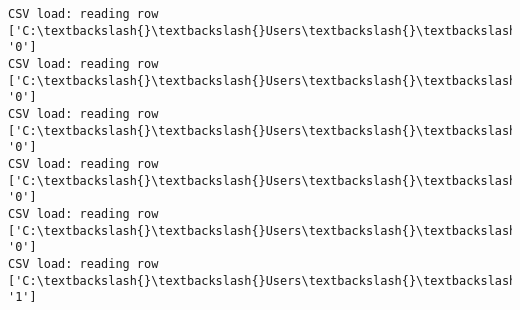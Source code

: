 \documentclass[11pt]{article}
\begin{document}
\begin{Verbatim}[commandchars=\\\{\}]
CSV load: reading row ['C:\textbackslash{}\textbackslash{}Users\textbackslash{}\textbackslash{}AbhishekGangadhar\textbackslash{}\textbackslash{}Downloads\textbackslash{}\textbackslash{}ActionRecog\textbackslash{}\textbackslash{}ActionRecog\textbackslash{}\textbackslash{}DataSets\textbackslash{}\textbackslash{}UCF11\textbackslash{}\textbackslash{}action\_youtube\_naudio\textbackslash{}\textbackslash{}biking\textbackslash{}\textbackslash{}v\_biking\_13\textbackslash{}\textbackslash{}v\_biking\_13\_02.avi', '0']
CSV load: reading row ['C:\textbackslash{}\textbackslash{}Users\textbackslash{}\textbackslash{}AbhishekGangadhar\textbackslash{}\textbackslash{}Downloads\textbackslash{}\textbackslash{}ActionRecog\textbackslash{}\textbackslash{}ActionRecog\textbackslash{}\textbackslash{}DataSets\textbackslash{}\textbackslash{}UCF11\textbackslash{}\textbackslash{}action\_youtube\_naudio\textbackslash{}\textbackslash{}biking\textbackslash{}\textbackslash{}v\_biking\_13\textbackslash{}\textbackslash{}v\_biking\_13\_03.avi', '0']
CSV load: reading row ['C:\textbackslash{}\textbackslash{}Users\textbackslash{}\textbackslash{}AbhishekGangadhar\textbackslash{}\textbackslash{}Downloads\textbackslash{}\textbackslash{}ActionRecog\textbackslash{}\textbackslash{}ActionRecog\textbackslash{}\textbackslash{}DataSets\textbackslash{}\textbackslash{}UCF11\textbackslash{}\textbackslash{}action\_youtube\_naudio\textbackslash{}\textbackslash{}biking\textbackslash{}\textbackslash{}v\_biking\_13\textbackslash{}\textbackslash{}v\_biking\_13\_04.avi', '0']
CSV load: reading row ['C:\textbackslash{}\textbackslash{}Users\textbackslash{}\textbackslash{}AbhishekGangadhar\textbackslash{}\textbackslash{}Downloads\textbackslash{}\textbackslash{}ActionRecog\textbackslash{}\textbackslash{}ActionRecog\textbackslash{}\textbackslash{}DataSets\textbackslash{}\textbackslash{}UCF11\textbackslash{}\textbackslash{}action\_youtube\_naudio\textbackslash{}\textbackslash{}biking\textbackslash{}\textbackslash{}v\_biking\_13\textbackslash{}\textbackslash{}v\_biking\_13\_05.avi', '0']
CSV load: reading row ['C:\textbackslash{}\textbackslash{}Users\textbackslash{}\textbackslash{}AbhishekGangadhar\textbackslash{}\textbackslash{}Downloads\textbackslash{}\textbackslash{}ActionRecog\textbackslash{}\textbackslash{}ActionRecog\textbackslash{}\textbackslash{}DataSets\textbackslash{}\textbackslash{}UCF11\textbackslash{}\textbackslash{}action\_youtube\_naudio\textbackslash{}\textbackslash{}biking\textbackslash{}\textbackslash{}v\_biking\_13\textbackslash{}\textbackslash{}v\_biking\_13\_06.avi', '0']
CSV load: reading row ['C:\textbackslash{}\textbackslash{}Users\textbackslash{}\textbackslash{}AbhishekGangadhar\textbackslash{}\textbackslash{}Downloads\textbackslash{}\textbackslash{}ActionRecog\textbackslash{}\textbackslash{}ActionRecog\textbackslash{}\textbackslash{}DataSets\textbackslash{}\textbackslash{}UCF11\textbackslash{}\textbackslash{}action\_youtube\_naudio\textbackslash{}\textbackslash{}golf\_swing\textbackslash{}\textbackslash{}v\_golf\_12\textbackslash{}\textbackslash{}v\_golf\_12\_01.avi', '1']

\end{Verbatim}
\end{document}
